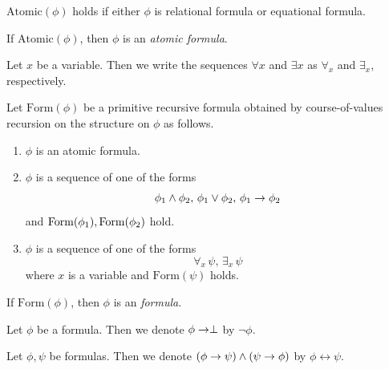 \documentclass[10pt]{amsart}
\begin{document}
\begin{definition}
	$\mathrm{Atomic}(\phi)$ holds if either $\phi$ is relational formula or equational formula.

	If $\mathrm{Atomic}(\phi)$, then $\phi$ is an \textit{atomic formula}.
\end{definition}

\begin{remark}\label{remark:quantifier_notation}
	Let $x$ be a variable. Then we write the sequences $\forall x$ and $\exists x$ as $\forall_x$ and $\exists_x$, respectively.
\end{remark}

\begin{definition}
	Let $\mathrm{Form}(\phi)$ be a primitive recursive formula obtained by course-of-values recursion on the structure on $\phi$ as follows.
	\begin{enumerate}[label=\textbf{(\arabic*)}, leftmargin=3.0em]
		\item $\phi$ is an atomic formula.
		\item $\phi$ is a sequence of one of the forms
		      $$\phi_{\rm{1}}\wedge \phi_{\rm{2}},\,\phi_{\rm{1}}\vee \phi_{\rm{2}},\,\phi_{\rm{1}}\rightarrow \phi_{\rm{2}}$$
		      and $\mathrm{Form}(\phi_{\rm{1}}),\mathrm{Form}(\phi_{\rm{2}})$ hold.
		\item $\phi$ is a sequence of one of the forms
		      $$\forall_x\,\psi,\,\exists_x\,\psi$$
		      where $x$ is a variable and $\mathrm{Form}(\psi)$ holds.
	\end{enumerate}
	If $\mathrm{Form}(\phi)$, then $\phi$ is an \textit{formula}.
\end{definition}

\begin{remark}\label{remark:negation_and_equivalence}
	Let $\phi$ be a formula. Then we denote $\phi \rightarrow \perp$ by $\neg \phi$.

	Let $\phi,\psi$ be formulas. Then we denote $(\phi \rightarrow \psi) \wedge (\psi \rightarrow \phi)$ by $\phi \leftrightarrow \psi$.
\end{remark}
\end{document}
